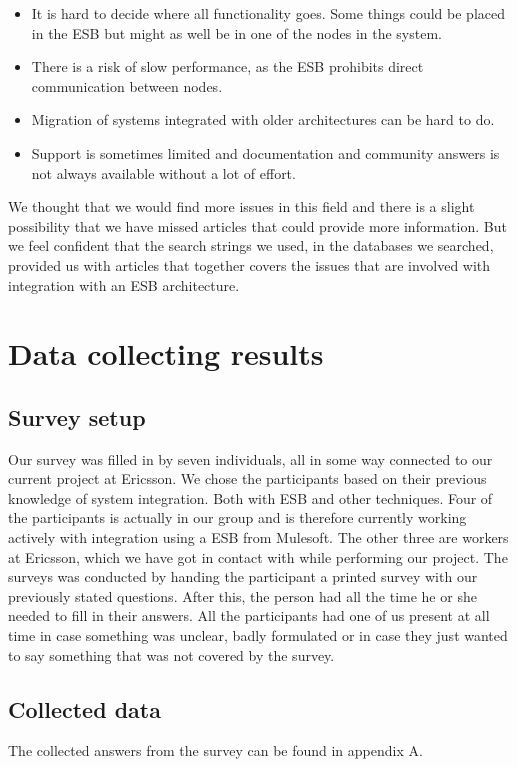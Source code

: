 \documentclass{llncs}
\begin{document}
\begin{itemize}
\item It is hard to decide where all functionality goes. Some things could be placed in the ESB but might as well be in one of the nodes in the system.
\item There is a risk of slow performance, as the ESB prohibits direct communication between nodes.
\item Migration of systems integrated with older architectures can be hard to do.
\item Support is sometimes limited and documentation and community answers is not always available without a lot of effort.
\end{itemize}

We thought that we would find more issues in this field and there is a slight possibility that we have missed articles that could provide more information. But we feel confident that the search strings we used, in the databases we searched, provided us with articles that together covers the issues that are involved with integration with an ESB architecture.

\section{Data collecting results}

\subsection{Survey setup}
Our survey was filled in by seven individuals, all in some way connected to our current project at Ericsson. We chose the participants based on their previous knowledge of system integration. Both with ESB and other techniques. Four of the participants is actually in our group and is therefore currently working actively with integration using a ESB from Mulesoft. The other three are workers at Ericsson, which we have got in contact with while performing our project.
The surveys was conducted by handing the participant a printed survey with our previously stated questions. After this, the person had all the time he or she needed to fill in their answers.
All the participants had one of us present at all time in case something was unclear, badly formulated or in case they just wanted to say something that was not covered by the survey.

\subsection{Collected data}
The collected answers from the survey can be found in appendix A.
\end{document}
